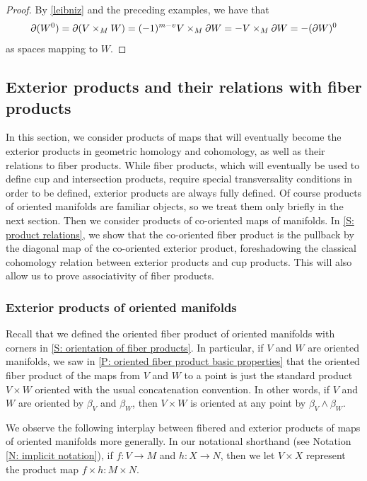 \begin{proof}
	By \cref{leibniz} and the preceding examples, we have that
	$$\partial (W^0) = \partial (V \times_M W) = (-1)^{m-v} V \times_M \partial W = -V \times_M \partial W = -(\partial W)^0$$
	as spaces mapping to $W$.
\end{proof}

\subsection{Exterior products and their relations with fiber products}\label{S: exterior products}

In this section, we consider products of maps that will eventually become the exterior products in geometric homology and cohomology, as well as their relations to fiber products.
While fiber products, which will eventually be used to define cup and intersection products, require special transversality conditions in order to be defined, exterior products are always fully defined.
Of course products of oriented manifolds are familiar objects, so we treat them only briefly in the next section.
Then we consider products of co-oriented maps of manifolds.
In \cref{S: product relations}, we show that the co-oriented fiber product is the pullback by the diagonal map of the co-oriented exterior product, foreshadowing the classical cohomology relation between exterior products and cup products.
This will also allow us to prove associativity of fiber products.

\subsubsection{Exterior products of oriented manifolds}\label{S: oriented product}

Recall that we defined the oriented fiber product of oriented manifolds with corners in \cref{S: orientation of fiber products}.
In particular, if $V$ and $W$ are oriented manifolds, we saw in \cref{P: oriented fiber product basic properties} that the oriented fiber product of the maps from $V$ and $W$ to a point is just the standard product $V \times W$ oriented with the usual concatenation convention.
In other words, if $V$ and $W$ are oriented by $\beta_V$ and $\beta_W$, then $V \times W$ is oriented at any point by $\beta_V \wedge \beta_W$.

We observe the following interplay between fibered and exterior products of maps of oriented manifolds more generally.
In our notational shorthand (see Notation \ref{N: implicit notation}), if $f \colon V \to M$ and $h \colon X \to N$, then we let $V \times X$ represent the product map $f \times h \colon M \times N$.

